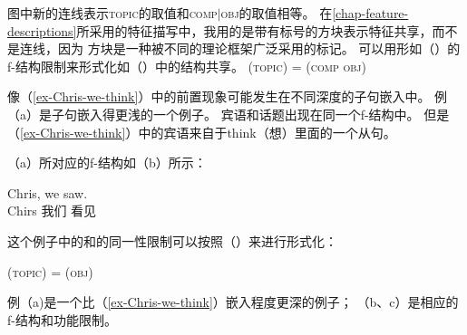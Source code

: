 \noindent
图中新的连线表示\textsc{topic}的取值和\textsc{comp$|$obj}的取值相等。
在\ref{chap-feature-descriptions}所采用的特征描写中，我用的是带有标号的方块表示特征共享，而不是连线，因为
方块是一种被不同的理论框架广泛采用的标记。
可以用形如（）的f-结构限制来形式化如（）中的结构共享。 
\ea
\label{Topic-Comp-Obj}
(\upsp  \textsc{topic}) = (\upsp \textsc{comp obj})
\z

\noindent
像（\ref{ex-Chris-we-think}）中的前置现象可能发生在不同深度的子句嵌入中。
例（a）是子句嵌入得更浅的一个例子。
宾语和话题出现在同一个f-结构中。
但是（\ref{ex-Chris-we-think}）中的宾语来自于think（想）里面的一个从句。

（a）所对应的f-结构如（b）所示：

\eal
\ex 
\gll Chris, we saw.\\
Chirs 我们 看见\\
\ex 
{}
\zl

\noindent
这个例子中的\topic{}和\lfgobj 的同一性限制可以按照（）来进行形式化：

\ea
\label{Topic-Obj}
(\upsp  \textsc{topic}) = (\upsp \textsc{obj})
\z

\noindent
例（a)是一个比（\ref{ex-Chris-we-think}）嵌入程度更深的例子；
（b、c）是相应的f-结构和功能限制。

